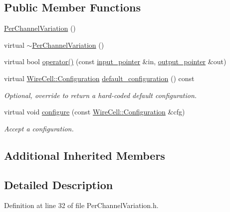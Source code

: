 \subsection*{Public Member Functions}
\begin{DoxyCompactItemize}
\item 
\hyperlink{class_wire_cell_1_1_gen_1_1_per_channel_variation_a75f1dd385f3ab3456bdd0e7d5b33f5a0}{Per\+Channel\+Variation} ()
\item 
virtual \hyperlink{class_wire_cell_1_1_gen_1_1_per_channel_variation_ab3dde56033d9af4732b6b5f047d4b328}{$\sim$\+Per\+Channel\+Variation} ()
\item 
virtual bool \hyperlink{class_wire_cell_1_1_gen_1_1_per_channel_variation_a3748bc71e6debe59dac26df158ffb3ff}{operator()} (const \hyperlink{class_wire_cell_1_1_i_function_node_a55c0946156df9b712b8ad1a0b59b2db6}{input\+\_\+pointer} \&in, \hyperlink{class_wire_cell_1_1_i_function_node_afc02f1ec60d31aacddf64963f9ca650b}{output\+\_\+pointer} \&out)
\item 
virtual \hyperlink{namespace_wire_cell_a9f705541fc1d46c608b3d32c182333ee}{Wire\+Cell\+::\+Configuration} \hyperlink{class_wire_cell_1_1_gen_1_1_per_channel_variation_a3e974e03fff59a5add7e4f9b7a5f2107}{default\+\_\+configuration} () const
\begin{DoxyCompactList}\small\item\em Optional, override to return a hard-\/coded default configuration. \end{DoxyCompactList}\item 
virtual void \hyperlink{class_wire_cell_1_1_gen_1_1_per_channel_variation_afc90740a0c322146c135575b2d7ace12}{configure} (const \hyperlink{namespace_wire_cell_a9f705541fc1d46c608b3d32c182333ee}{Wire\+Cell\+::\+Configuration} \&cfg)
\begin{DoxyCompactList}\small\item\em Accept a configuration. \end{DoxyCompactList}\end{DoxyCompactItemize}
\subsection*{Additional Inherited Members}


\subsection{Detailed Description}


Definition at line 32 of file Per\+Channel\+Variation.\+h.



